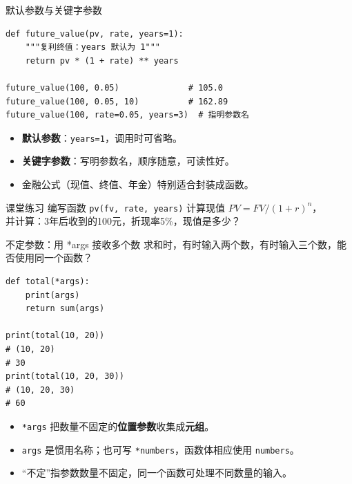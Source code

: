 \documentclass[9pt]{ctexbeamer}
\begin{document}
\begin{frame}[fragile]{默认参数与关键字参数}
	\begin{lstlisting}
def future_value(pv, rate, years=1):
    """复利终值：years 默认为 1"""
    return pv * (1 + rate) ** years

future_value(100, 0.05)              # 105.0
future_value(100, 0.05, 10)          # 162.89
future_value(100, rate=0.05, years=3)  # 指明参数名
\end{lstlisting}
	\begin{itemize}
		\item \textbf{默认参数}：\texttt{years=1}，调用时可省略。
		\item \textbf{关键字参数}：写明参数名，顺序随意，可读性好。
		\item 金融公式（现值、终值、年金）特别适合封装成函数。
	\end{itemize}
	\begin{exampleblock}{课堂练习}
		编写函数 \texttt{pv(fv, rate, years)} 计算现值 $PV = FV/(1+r)^n$，\\
		并计算：3年后收到的100元，折现率5\%，现值是多少？
	\end{exampleblock}
\end{frame}


\begin{frame}[fragile]{不定参数：用 *args 接收多个数}
求和时，有时输入两个数，有时输入三个数，能否使用同一个函数？
\begin{lstlisting}
def total(*args):
    print(args)
    return sum(args)

print(total(10, 20))
# (10, 20)
# 30
print(total(10, 20, 30))
# (10, 20, 30)
# 60
\end{lstlisting}
\begin{itemize}
\item \texttt{*args} 把数量不固定的\textbf{位置参数}收集成\textbf{元组}。
\item \texttt{args} 是惯用名称；也可写 \texttt{*numbers}，函数体相应使用 \texttt{numbers}。
\item “不定”指\alert{参数数量不固定}，同一个函数可处理不同数量的输入。
\end{itemize}
\end{frame}
\end{document}
